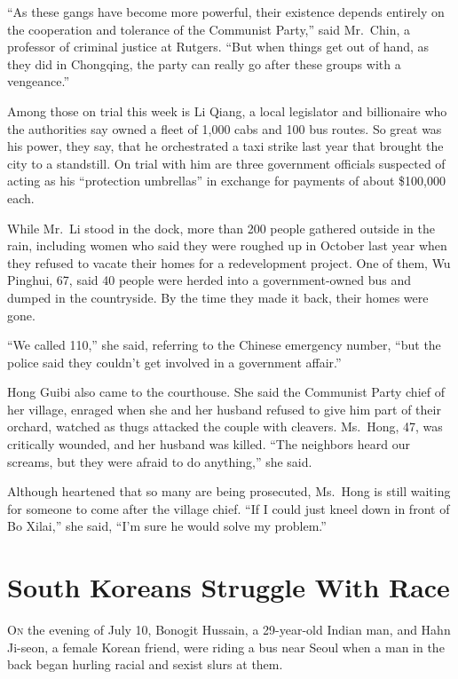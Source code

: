 ﻿\documentclass[12pt]{article}
\begin{document}
``As these gangs have become more powerful, their existence depends entirely on the cooperation and
tolerance of the Communist Party,'' said Mr.~Chin, a professor of criminal justice at Rutgers. ``But
when things get out of hand, as they did in Chongqing, the party can really go after these groups
with a vengeance.''

Among those on trial this week is Li Qiang, a local legislator and billionaire who the authorities
say owned a fleet of 1,000 cabs and 100 bus routes. So great was his power, they say, that he
orchestrated a taxi strike last year that brought the city to a standstill. On trial with him are
three government officials suspected of acting as his ``protection umbrellas'' in exchange for
payments of about \$100,000 each.

While Mr.~Li stood in the dock, more than 200 people gathered outside in the rain, including women
who said they were roughed up in October last year when they refused to vacate their homes for a
redevelopment project. One of them, Wu Pinghui, 67, said 40 people were herded into a
government-owned bus and dumped in the countryside. By the time they made it back, their homes were
gone.

``We called 110,'' she said, referring to the Chinese emergency number, ``but the police said they
couldn't get involved in a government affair.''

Hong Guibi also came to the courthouse. She said the Communist Party chief of her village, enraged
when she and her husband refused to give him part of their orchard, watched as thugs attacked the
couple with cleavers. Ms.~Hong, 47, was critically wounded, and her husband was killed. ``The
neighbors heard our screams, but they were afraid to do anything,'' she said.

Although heartened that so many are being prosecuted, Ms.~Hong is still waiting for someone to come
after the village chief. ``If I could just kneel down in front of Bo Xilai,'' she said, ``I'm sure
he would solve my problem.''

\section{South Koreans Struggle With Race}

\lettrine{O}{n} the evening of July 10, Bonogit Hussain, a 29-year-old
Indian man, and Hahn Ji-seon, a female Korean friend, were riding a bus near Seoul when a man in the
back began hurling racial and sexist slurs at them.
\end{document}
